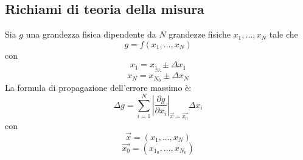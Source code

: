 \subsection{Richiami di teoria della misura}
Sia $g$ una grandezza fisica dipendente da $N$ grandezze fisiche $x_1,...,x_N$ tale che
\begin{equation}
    g=f(x_1,...,x_N)
\end{equation}
con
\begin{equation}
    x_1 = x_{1_0}\pm \Delta x_1
\end{equation}
$$ ... $$
\begin{equation}
    x_N = x_{N_0}\pm \Delta x_N
\end{equation}
La formula di propagazione dell'errore massimo è:
\begin{equation}
    \Delta g=\displaystyle\sum_{i=1}^{N}\left|\frac{\partial g}{\partial x_i}\right|_{\vec{x}=\vec{x_0}}\Delta x_i
\end{equation}
con
\begin{equation}
    \vec{x}=(x_1,...,x_N)
\end{equation}
\begin{equation}
    \vec{x_0}=(x_{1_0},...,x_{N_0})
\end{equation}

